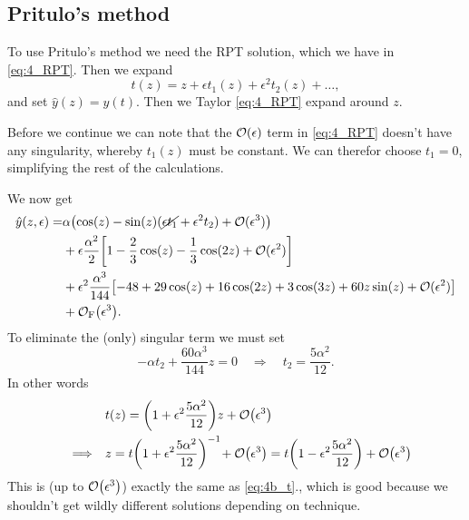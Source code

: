 \documentclass[11pt,letter, swedish, english
]{article}
\begin{document}
\subsection{Pritulo's method}
\newcommand{\hy}{\ensuremath{\hat{y}}}
To use Pritulo's method we need the RPT solution, which we have in
\eqref{eq:4_RPT}. Then we expand
\begin{equation}
t(z)=z+\epsilon t_1(z)+\epsilon^2t_2(z)+\ldots,
\end{equation}
and set $\hy(z)=y(t)$. Then we Taylor \eqref{eq:4_RPT} expand around
$z$.  

Before we continue we can note that the $\order{\epsilon}$ term in
\eqref{eq:4_RPT} doesn't have any singularity, whereby $t_1(z)$ must be
constant. We can therefor choose $t_1=0$, simplifying the rest of the
calculations. 

We now get
\begin{equation}
\begin{aligned}
\hy(z, \epsilon)=&\alpha\qty(\cos(z)-\sin(z)(\cancel{\epsilon t_1}+\epsilon^2t_2)+\order*{\epsilon^3})\\
&+\epsilon\frac{\alpha^2}{2}
\qty[1-\frac{2}{3}\cos(z)-\frac{1}{3}\cos(2z) + \order*{\epsilon^2}]\\
&+\epsilon^2\frac{\alpha^3}{144}
\qty[-48+29\cos(z)+16\cos(2z)+3\cos(3z)+60z\sin(z)+ \order*{\epsilon^2}]\\
&+\mathcal{O}_\text{F}\qty(\epsilon^3).
\end{aligned}
\end{equation}
To eliminate the (only) singular term we must set
\begin{equation}
-\alpha t_2+\frac{60\alpha^3}{144}z=0
\quad\Longrightarrow\quad
t_2=\frac{5\alpha^2}{12}.
\end{equation}
In other words 
\begin{equation}
\begin{aligned}
&t(z)=\qty(1+\epsilon^2\frac{5\alpha^2}{12})z+\order{\epsilon^3}\\
\quad\Longrightarrow\quad&
z=t\qty(1+\epsilon^2\frac{5\alpha^2}{12})^{-1}\!+\order{\epsilon^3}
=t\qty(1-\epsilon^2\frac{5\alpha^2}{12})+\order{\epsilon^3}
\end{aligned}
\end{equation}
This is (up to $\order{\epsilon^3}$) exactly the same as
\eqref{eq:4b_t}., which is good because we shouldn't get wildly
different solutions depending on technique.
\end{document}
